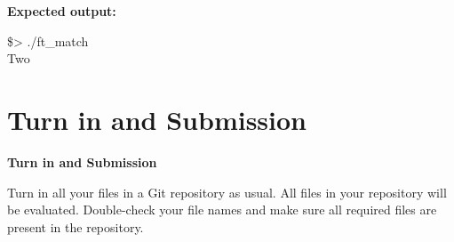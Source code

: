 \documentclass[a4paper,12pt]{report}
\begin{document}
\vspace{0.5cm}

\textbf{Expected output:}

\begin{center}
\begin{tcolorbox}[terminal]
\$> ./ft\_match \\
Two
\end{tcolorbox}
\end{center}


\newpage

\chapter{Turn in and Submission}

\vspace{0.8cm}

{\LARGE\bfseries Turn in and Submission}

\vspace{0.5cm}

Turn in all your files in a Git repository as usual. All files in your repository
will be evaluated. Double-check your file names and make sure all required files are
present in the repository.

\end{document}
